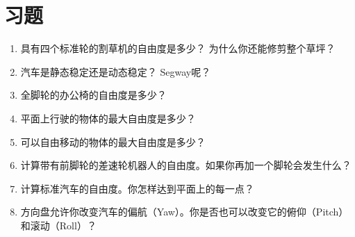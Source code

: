 \section*{习题}\small
\begin{enumerate}
\item 具有四个标准轮的割草机的自由度是多少？ 为什么你还能修剪整个草坪？
\item 汽车是静态稳定还是动态稳定？ Segway呢？
\item 全脚轮的办公椅的自由度是多少？
\item 平面上行驶的物体的最大自由度是多少？
\item 可以自由移动的物体的最大自由度是多少？
\item 计算带有前脚轮的差速轮机器人的自由度。如果你再加一个脚轮会发生什么？
\item 计算标准汽车的自由度。你怎样达到平面上的每一点？
\item 方向盘允许你改变汽车的偏航（Yaw）。你是否也可以改变它的俯仰（Pitch）和滚动（Roll）？
\end{enumerate}\normalsize

